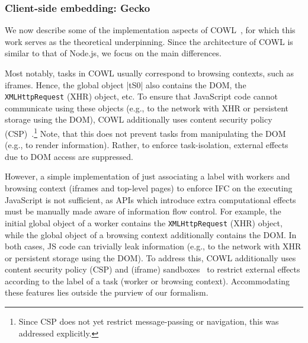 \subsubsection{Client-side embedding: Gecko}

We now describe some of the implementation aspects of
COWL~\cite{swapi}, for which this work serves as the theoretical
underpinning.
%
Since the architecture of COWL is similar to that of Node.js, we focus
on the main differences.
 
Most notably, tasks in COWL usually correspond to browsing contexts,
such as iframes.
%
Hence, the global object |tS0| also contains the DOM, the
\verb|XMLHttpRequest| (XHR) object, etc.
%
To ensure that JavaScript code cannot communicate using these objects
(e.g., to the network with XHR or persistent storage using the DOM),
COWL additionally uses content security policy (CSP)~\cite{csp1.1}.\footnote{
  Since CSP does not yet restrict message-passing or navigation, this
  was addressed explicitly.
}
%
Note, that this does not prevent tasks from manipulating the DOM
(e.g., to render information).
%
Rather, to enforce task-isolation, external effects due to DOM access
are suppressed.


However, a simple implementation of just associating a label with
workers and browsing context (iframes and top-level pages) to enforce
IFC on the executing JavaScript is not sufficient, as APIs which
introduce extra computational effects must be manually made aware of information flow
control.
%
For example, the initial global object of a worker contains the
\texttt{XMLHttpRequest} (XHR) object, while the global object of a
browsing context additionally contains the DOM.
%
In both cases, JS code can trivially leak information (e.g., to the
network with XHR or persistent storage using the DOM).
%
To address this, COWL additionally uses content security policy (CSP) and
(iframe) sandboxes~\cite{csp1.1,html5} to restrict external effects according
to the label of a task (worker or browsing context).  Accommodating these
features lies outside the purview of our formalism.

